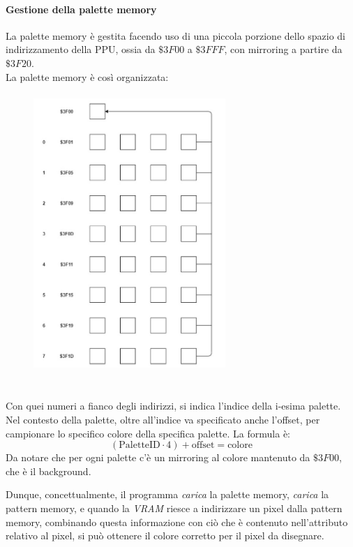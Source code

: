 \documentclass[11pt]{article}
\begin{document}
\paragraph{Gestione della palette memory}
La palette memory è gestita facendo uso di una piccola porzione dello spazio di indirizzamento della PPU, ossia da $\$3F00$ a $\$3FFF$, con mirroring a partire da $\$3F20$.\\
La palette memory è così organizzata:
\begin{figure}[h]
\centering
\includegraphics[width=275px, height=400px]{PALETTE_STORING.jpg}
\end{figure}\\
Con quei numeri a fianco degli indirizzi, si indica l'indice della i-esima palette. Nel contesto della palette, oltre all'indice va specificato anche l'offset, per campionare lo specifico colore della specifica palette. La formula è:
\[
	(\textrm{PaletteID}\cdot 4)+\textrm{offset}=\textrm{colore}
\]
Da notare che per ogni palette c'è un mirroring al colore mantenuto da $\$3F00$, che è il background.

Dunque, concettualmente, il programma \emph{carica} la palette memory, \emph{carica} la pattern memory, e quando la \emph{VRAM} riesce a indirizzare un pixel dalla pattern memory, combinando questa informazione con ciò che è contenuto nell'attributo relativo al pixel, si può ottenere il colore corretto per il pixel da disegnare.
\end{document}
